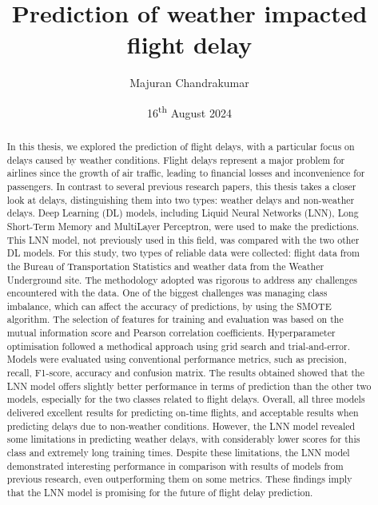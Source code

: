 \documentclass[12pt,oneside]{book} %
\title{Prediction of weather impacted flight delay}
\author{Majuran Chandrakumar}
\date{16\textsuperscript{th} August 2024}
\begin{document}
\frontmatter

\maketitle


\begin{abstract}
\noindent In this thesis, we explored the prediction of flight delays, with a particular focus on delays caused by weather conditions. Flight delays represent a major problem for airlines since the growth of air traffic, leading to financial losses and inconvenience for passengers. In contrast to several previous research papers, this thesis takes a closer look at delays, distinguishing them into two types: weather delays and non-weather delays. Deep Learning (DL) models, including Liquid Neural Networks (LNN), Long Short-Term Memory and MultiLayer Perceptron, were used to make the predictions. This LNN model, not previously used in this field, was compared with the two other DL models. For this study, two types of reliable data were collected: flight data from the Bureau of Transportation Statistics and weather data from the Weather Underground site. The methodology adopted was rigorous to address any challenges encountered with the data. One of the biggest challenges was managing class imbalance, which can affect the accuracy of predictions, by using the SMOTE algorithm. The selection of features for training and evaluation was based on the mutual information score and Pearson correlation coefficients. Hyperparameter optimisation followed a methodical approach using grid search and trial-and-error. Models were evaluated using conventional performance metrics, such as precision, recall, F1-score, accuracy and confusion matrix. The results obtained showed that the LNN model offers slightly better performance in terms of prediction than the other two models, especially for the two classes related to flight delays. Overall, all three models delivered excellent results for predicting on-time flights, and acceptable results when predicting delays due to non-weather conditions. However, the LNN model revealed some limitations in predicting weather delays, with considerably lower scores for this class and extremely long training times. Despite these limitations, the LNN model demonstrated interesting performance in comparison with results of models from previous research, even outperforming them on some metrics. These findings imply that the LNN model is promising for the future of flight delay prediction.
\end{abstract}
\end{document}
